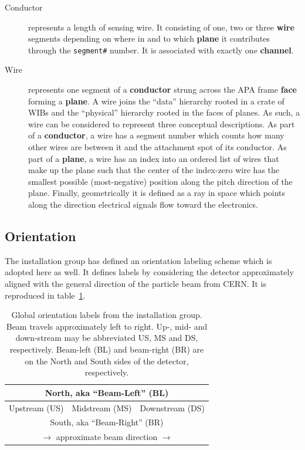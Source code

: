 \documentclass[pdftex,12pt,letter]{article}
\begin{document}
\begin{description}
\item[Conductor] represents a length of sensing wire. It consisting of
  one, two or three \textbf{wire} segments depending on where in and to which
  \textbf{plane} it contributes through the \texttt{segment\#} number.  It is
  associated with exactly one \textbf{channel}.

\item[Wire] represents one segment of a \textbf{conductor} strung
  across the APA frame \textbf{face} forming a \textbf{plane}.  A wire
  joins the ``data'' hierarchy rooted in a crate of WIBs and the
  ``physical'' hierarchy rooted in the faces of planes.  As such, a
  wire can be considered to represent three conceptual descriptions.
  As part of a \textbf{conductor}, a wire has a segment number which
  counts how many other wires are between it and the attachment spot
  of its conductor.  As part of a \textbf{plane}, a wire has an index
  into an ordered list of wires that make up the plane such that the
  center of the index-zero wire has the smallest possible
  (most-negative) position along the pitch direction of the plane.
  Finally, geometrically it is defined as a ray in space which points
  along the  direction electrical signals flow toward the electronics.
\end{description}

\subsection{Orientation}

The installation group has defined an orientation labeling scheme
which is adopted here as well.  It defines labels by
considering the detector approximately aligned with the general
direction of the particle beam from CERN.  It is reproduced in
table~\ref{tab:global}.

\begin{table}[htp]
  \centering
  \begin{tabular}[h]{|c|c|c|}
    \hline
    \multicolumn{3}{|c|}{North, aka ``Beam-Left'' (BL)} \\
    \hline
    Upstream (US) & Midstream (MS) & Downstream (DS) \\
    \hline
    \multicolumn{3}{|c|}{South, aka ``Beam-Right'' (BR)} \\
    \hline
    \multicolumn{3}{c}{$\longrightarrow$ approximate beam direction $\longrightarrow$} \\    
  \end{tabular}
  \caption{Global orientation labels from the installation group.
    Beam travels approximately left to right.  Up-, mid- and
    down-stream may be abbreviated US, MS and DS, respectively.
    Beam-left (BL) and beam-right (BR) are on the North and South
    sides of the detector, respectively.}
  \label{tab:global}
\end{table}
\end{document}
